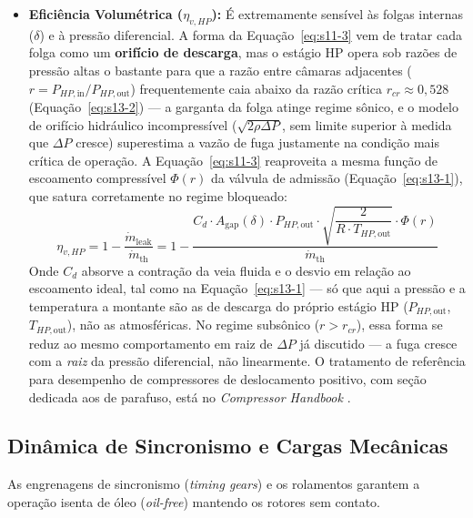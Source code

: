 \documentclass[12pt,a4paper]{article}
\numberwithin{equation}{section}
\numberwithin{table}{section}
\numberwithin{figure}{section}
\begin{document}
{\begin{itemize}
		\item \textbf{Eficiência Volumétrica ($\eta_{v,HP}$):}
		É extremamente sensível às folgas internas ($\delta$) e à pressão diferencial. A forma da Equação~\eqref{eq:s11-3} vem de tratar cada folga como um \textbf{orifício de descarga}, mas o estágio HP opera sob razões de pressão altas o bastante para que a razão entre câmaras adjacentes ($r = P_{HP,\text{in}}/P_{HP,\text{out}}$) frequentemente caia abaixo da razão crítica $r_{cr} \approx 0{,}528$ (Equação~\eqref{eq:s13-2}) — a garganta da folga atinge regime sônico, e o modelo de orifício hidráulico incompressível ($\sqrt{2\rho\Delta P}$, sem limite superior à medida que $\Delta P$ cresce) superestima a vazão de fuga justamente na condição mais crítica de operação. A Equação~\eqref{eq:s11-3} reaproveita a mesma função de escoamento compressível $\Phi(r)$ da válvula de admissão (Equação~\eqref{eq:s13-1}), que satura corretamente no regime bloqueado:
		\begin{equation}\label{eq:s11-3}
 \eta_{v,HP} = 1 - \frac{\dot{m}_{\text{leak}}}{\dot{m}_{\text{th}}} = 1 - \frac{C_d \cdot A_{\text{gap}}(\delta) \cdot P_{HP,\text{out}} \cdot \sqrt{\dfrac{2}{R \cdot T_{HP,\text{out}}}} \cdot \Phi(r)}{\dot{m}_{\text{th}}}
\end{equation}
		Onde $C_d$ absorve a contração da veia fluida e o desvio em relação ao escoamento ideal, tal como na Equação~\eqref{eq:s13-1} — só que aqui a pressão e a temperatura a montante são as de descarga do próprio estágio HP ($P_{HP,\text{out}}$, $T_{HP,\text{out}}$), não as atmosféricas. No regime subsônico ($r > r_{cr}$), essa forma se reduz ao mesmo comportamento em raiz de $\Delta P$ já discutido — a fuga cresce com a \textit{raiz} da pressão diferencial, não linearmente. O tratamento de referência para desempenho de compressores de deslocamento positivo, com seção dedicada aos de parafuso, está no \textit{Compressor Handbook} \cite[Cap.~1 e 2]{hanlon}.
	\end{itemize}
	
	\subsection{\textbf{Dinâmica de Sincronismo e Cargas Mecânicas}}
	As engrenagens de sincronismo (\textit{timing gears}) e os rolamentos garantem a operação isenta de óleo (\textit{oil-free}) mantendo os rotores sem contato.
	
}
\end{document}
